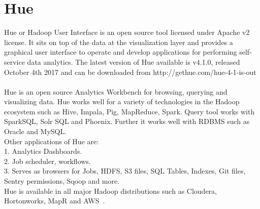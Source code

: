 \section{Hue}

Hue or Hadoop User Interface is an open source tool licensed 
under Apache v2 license. It sits on top of the data at the 
visualization layer and provides a graphical user interface to 
operate and develop applications for performing self-service 
data analytics.
The latest version of Hue available is v4.1.0, released October 
4th 2017 and can be downloaded from http://gethue.com/hue-4-1-is-out
~\cite{hid-sp18-517-hue-apache} \\

Hue is an open source Analytics Workbench for browsing, querying 
and visualizing data.
Hue works well for a variety of technologies in the Hadoop 
ecosystem such as Hive, Impala, Pig, MapReduce, Spark. Query 
tool works with SparkSQL, Solr SQL and Phoenix. Further it works 
well with RDBMS such as Oracle and MySQL. \\

Other applications of Hue are: \\

1. Analytics Dashboards. \\
2. Job scheduler, workflows. \\
3. Serves as browsers for Jobs, HDFS, S3 files, SQL Tables, Indexes, 
Git files, Sentry permissions, Sqoop and more. \\

Hue is available in all major Hadoop distributions such as Cloudera, 
Hortonworks, MapR and AWS~\cite{hid-sp18-517-Hue-wiki}.

